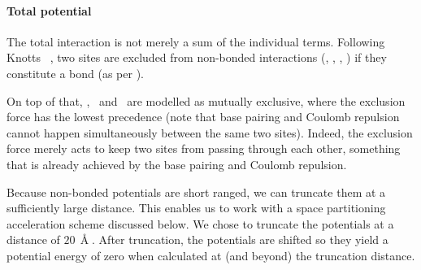 \paragraph{Total potential}
The total interaction is not merely a sum of the individual terms.
Following Knotts \etal\ \cite{knotts2007coarse}, two sites are excluded from non-bonded interactions (\Vstck, \Vbp, \Vqq, \Vexcl) if they constitute a bond (as per \Vbond).

On top of that, \Vbp, \Vqq\ and \Vexcl\ are modelled as mutually exclusive, where the exclusion force has the lowest precedence (note that base pairing and Coulomb repulsion cannot happen simultaneously between the same two sites).
Indeed, the exclusion force merely acts to keep two sites from passing through each other, something that is already achieved by the base pairing and Coulomb repulsion.

Because non-bonded potentials are short ranged, we can truncate them at a sufficiently large distance.
This enables us to work with a space partitioning acceleration scheme discussed below.
We chose to truncate the potentials at a distance of $20\,\Angstrom$. After truncation, the potentials are shifted so they yield a potential energy of zero when calculated at (and beyond) the truncation distance.

